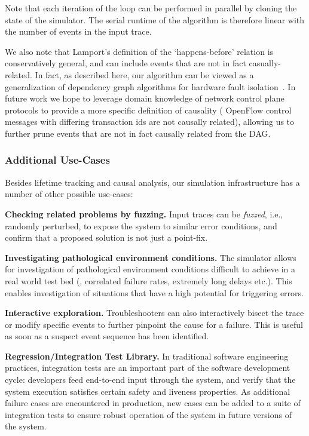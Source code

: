 Note that each iteration of the loop can be performed in parallel by cloning
the state of the simulator. The serial runtime of the algorithm is therefore
linear with the number of events in the input trace.

We also note that Lamport's definition of the `happens-before' relation is
conservatively general, and can include events that are not in fact
casually-related. In fact, as described here, our algorithm can be viewed as a
generalization of dependency graph algorithms for hardware fault
isolation~\cite{577079}. In future work we hope to leverage domain
knowledge of network control plane
protocols to provide a more specific definition of causality (\eg{} OpenFlow
control messages with differing transaction ids are not causally related),
allowing us to further prune events that are not in fact causally related from the DAG.

\subsubsection{Additional Use-Cases} Besides lifetime tracking and causal analysis, our simulation infrastructure has a
number of other possible use-cases:

\noindent\textbf{Checking related problems by fuzzing.} Input traces can be \emph{fuzzed}, i.e.,
randomly perturbed, to expose the system to similar error conditions, and confirm
that a proposed solution is not just a point-fix. 

\noindent\textbf{Investigating pathological environment conditions.} The simulator allows for investigation
of pathological environment conditions difficult to achieve in a real world test bed
(\eg{}, correlated failure rates, extremely long delays etc.). This enables
investigation of situations that have a high potential for triggering errors.

\noindent\textbf{Interactive exploration.} Troubleshooters can also interactively bisect
the trace or modify specific events to further pinpoint the cause for a failure.
This is useful as soon as a suspect event sequence has been identified.

\noindent\textbf{Regression/Integration Test Library.} In traditional software engineering practices,
integration tests are an
important part of the software development cycle: developers feed end-to-end
input through the system, and verify that the system execution satisfies
certain safety and liveness properties. As additional failure cases are encountered in
production, new cases can be added to a suite of integration tests to
ensure robust operation of the system in future versions of the system.

